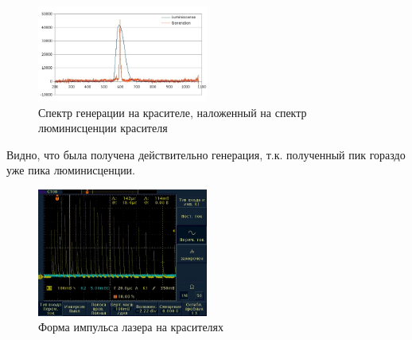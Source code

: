 \documentclass[twocolumn]{article}
\begin{document}
\begin{figure}[h]
\includegraphics[width=0.5\textwidth]{LEMPH Report_files/lumin and gener.jpg}
\caption{Спектр генерации на красителе, наложенный на спектр люминисценции красителя}
\end{figure}

Видно, что была получена действительно генерация, т.к. полученный пик гораздо уже пика люминисценции.


\begin{figure}[h!]
    \includegraphics[width=0.5\textwidth]{LEMPH Report_files/with filters.jpg}
    \caption{Форма импульса лазера на красителях}
    \end{figure}
        

        \renewcommand{\indexname}{Index}
  

    
\end{document}
